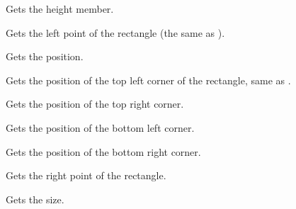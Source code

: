 \label{wxrectgetheight}


Gets the height member.


\label{wxrectgetleft}


Gets the left point of the rectangle (the same as ).


\label{wxrectgetposition}


Gets the position.


\label{wxrectgettopleft}


Gets the position of the top left corner of the rectangle, same as 
.


\label{wxrectgettopright}


Gets the position of the top right corner.


\label{wxrectgetbottomleft}


Gets the position of the bottom left corner.


\label{wxrectgetbottomright}


Gets the position of the bottom right corner.


\label{wxrectgetright}


Gets the right point of the rectangle.


\label{wxrectgetsize}


Gets the size.




\label{wxrectgettop}

